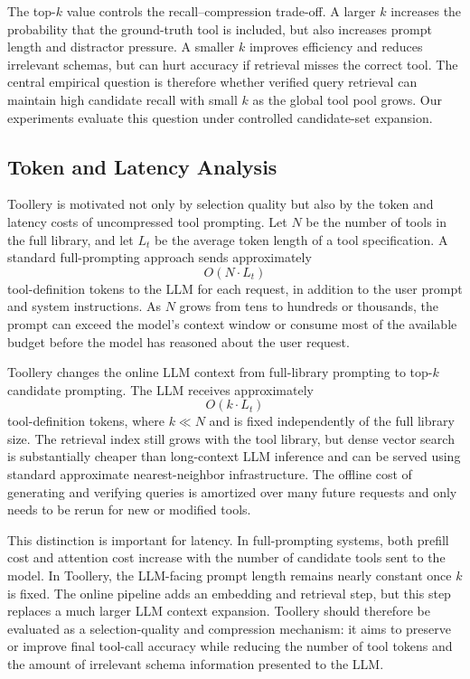 The top-$k$ value controls the recall--compression trade-off. A larger $k$ increases the probability that the ground-truth tool is included, but also increases prompt length and distractor pressure. A smaller $k$ improves efficiency and reduces irrelevant schemas, but can hurt accuracy if retrieval misses the correct tool. The central empirical question is therefore whether verified query retrieval can maintain high candidate recall with small $k$ as the global tool pool grows. Our experiments evaluate this question under controlled candidate-set expansion.

\subsection{Token and Latency Analysis}
\label{subsec:token_latency}

Toollery is motivated not only by selection quality but also by the token and latency costs of uncompressed tool prompting. Let $N$ be the number of tools in the full library, and let $L_t$ be the average token length of a tool specification. A standard full-prompting approach sends approximately
\begin{equation}
    O(N \cdot L_t)
\end{equation}
tool-definition tokens to the LLM for each request, in addition to the user prompt and system instructions. As $N$ grows from tens to hundreds or thousands, the prompt can exceed the model's context window or consume most of the available budget before the model has reasoned about the user request.

Toollery changes the online LLM context from full-library prompting to top-$k$ candidate prompting. The LLM receives approximately
\begin{equation}
    O(k \cdot L_t)
\end{equation}
tool-definition tokens, where $k \ll N$ and is fixed independently of the full library size. The retrieval index still grows with the tool library, but dense vector search is substantially cheaper than long-context LLM inference and can be served using standard approximate nearest-neighbor infrastructure. The offline cost of generating and verifying queries is amortized over many future requests and only needs to be rerun for new or modified tools.

This distinction is important for latency. In full-prompting systems, both prefill cost and attention cost increase with the number of candidate tools sent to the model. In Toollery, the LLM-facing prompt length remains nearly constant once $k$ is fixed. The online pipeline adds an embedding and retrieval step, but this step replaces a much larger LLM context expansion. Toollery should therefore be evaluated as a selection-quality and compression mechanism: it aims to preserve or improve final tool-call accuracy while reducing the number of tool tokens and the amount of irrelevant schema information presented to the LLM.

